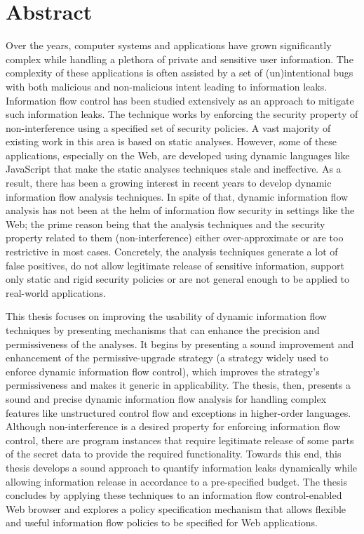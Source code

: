 \section*{Abstract}

{
Over the years, computer systems and applications have grown
significantly complex while handling a plethora of private and
sensitive user information. The complexity of these applications is
often assisted by a set of (un)intentional bugs with both malicious
and non-malicious intent leading to information leaks. Information
flow control has been studied extensively as an approach to mitigate
such information leaks. The technique works by enforcing the security
property of non-interference using a specified set of security
policies. A vast majority of existing work in this area
is based on static analyses. However, some of these applications,
especially on the Web, are developed using dynamic languages like
JavaScript that make the static analyses techniques stale and
ineffective. As a result, there has been a growing interest in recent
years to develop dynamic information flow analysis techniques. In
spite of that, dynamic information flow analysis has not been at the
helm of information flow security in settings like the Web; the prime
reason being that the analysis techniques and the security property
related to them (non-interference) either over-approximate or are too
restrictive in most cases. Concretely, the analysis techniques
generate a lot of false positives, do not allow legitimate release of
sensitive information, support only static and rigid security
policies or are not general enough to be applied to real-world
applications. 

This thesis focuses on improving the usability of dynamic information
flow techniques by presenting mechanisms that can enhance the
precision and permissiveness of the analyses. It begins by presenting
a sound improvement and enhancement of the permissive-upgrade
strategy (a strategy widely used to enforce dynamic information flow
control), which improves the strategy's permissiveness and makes it
generic in applicability. The thesis, then, presents a sound and
precise dynamic information flow analysis for handling complex
features like unstructured control flow and exceptions in higher-order 
languages. Although non-interference is a desired property for
enforcing information flow control, there are program instances that
require legitimate release of some parts of the secret data to provide
the required functionality. Towards this end, this thesis develops a sound 
approach to quantify information leaks dynamically while allowing 
information release in accordance to a pre-specified budget. The thesis
concludes by applying these techniques to an information flow
control-enabled Web browser and explores a policy specification 
mechanism that allows flexible and useful information flow policies to 
be specified for Web applications. 

}
